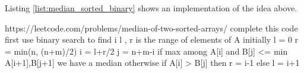 Listing \ref{list:median_sorted_binary} shows an implementation of the idea above.




https://leetcode.com/problems/median-of-two-sorted-arrays/ complete this code first
use binary search to find i
l , r is the range of elements of A initially l = 0 r = min(n, (n+m)/2)
i = l+r/2
j = n+m-i
if max among A[i] and B[j] <= min A[i+1],B[j+1] we have a median
otherwise 
if A[i] > B[j] then r = i-1
else l = i+1